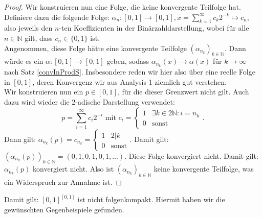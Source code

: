 \documentclass[11pt]{scrartcl}
\newcommand{\N}{\mathbb{N}}
\begin{document}
\begin{proof}
	Wir konstruieren nun eine Folge, die keine konvergente Teilfolge hat. Definiere dazu die folgende Folge:
	$\alpha_n: [0,1]\rightarrow [0,1], x = \sum_{k=1}^\infty c_k 2^{-k} \mapsto c_n$, also jeweils den $n$-ten
	Koeffizienten in der Binärzahldarstellung, wobei für alle $n\in\N$ gilt, dass $c_n \in \{ 0,1\}$ ist.\\
	Angenommen, diese Folge hätte eine konvergente Teilfolge $(\alpha_{n_k})_{k\in\mathbb N}$. Dann würde es ein $\alpha:[0,1]\rightarrow[0,1]$
	geben, sodass $\alpha_{n_k}(x)\rightarrow \alpha(x)$ für $k\rightarrow \infty$ nach Satz \ref{convInProdS}. Insbesondere reden wir hier also über eine reelle Folge
	in $[0,1]$, deren Konvergenz wir aus Analysis 1 ziemlich gut verstehen.\\
	Wir konstruieren nun ein $p\in [0,1]$, für die dieser Grenzwert nicht gilt. Auch dazu wird wieder die 2-adische Darstellung verwendet: $$p= \sum_{i=1}^\infty c_i 2^{-i} \textrm{ mit } c_i=\begin{cases}
		1 & \exists k\in 2\N: i=n_k\\
		0 & \textrm{sonst}
	\end{cases}.$$ 
	Dann gilt: $\alpha_{n_k}(p)= c_{n_k}=\begin{cases}1&2|k\\0&\textrm{sonst}\end{cases}$. Damit gilt: $(\alpha_{n_k}(p))_{k\in\mathbb N}=(0,1,0,1,0,1,...)$. Diese Folge konvergiert nicht. Damit gilt: $\alpha_{n_k}(p)$
	konvergiert nicht. Also ist $(\alpha_{n_k})_{k\in\mathbb N}$ keine konvergente Teilfolge, was ein Widerspruch zur Annahme ist.
\end{proof}
Damit gilt: $[0,1]^{[0,1]}$ ist nicht folgenkompakt. Hiermit haben wir die gewünschten Gegenbeispiele gefunden.
\end{document}
